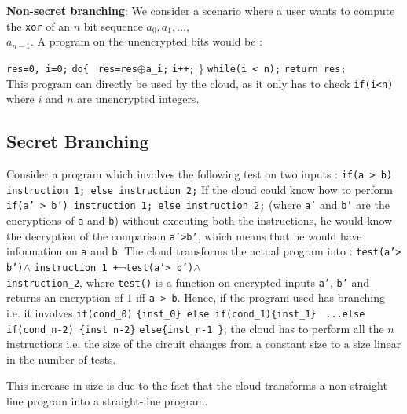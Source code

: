 \documentclass{acm_proc_article-sp}
\begin{document}
\textbf{Non-secret branching}: We consider a scenario where a user wants to compute the \texttt{xor} of an $n$ bit sequence $a_0,a_1,\ldots,$ \\ $a_{n-1}$. A program on the unencrypted bits would be :

 \phantom{x} \texttt{res=0, i=0;}
\newline \phantom{x} \texttt{do\{ }
\newline \phantom{x} \hspace{9ex} \texttt{res=res$\oplus$a\_i;}
\newline \phantom{x} \hspace{9ex} \texttt{i++;} 
\newline   \phantom{x} \} \texttt{while(i < n);} 
\newline  \phantom{x} \texttt{return res;}\\

This program can directly be used by the cloud, as it only has to check \texttt{if(i<n)} where $i$ and $n$ are unencrypted integers.

\subsection{Secret Branching}

Consider a program which involves the following test on two inputs : \texttt{if(a > b) instruction\_1; else instruction\_2;} If the cloud could know how to perform \texttt{if(a' > b') instruction\_1; else instruction\_2;} (where \texttt{a'} and \texttt{b'} are the encryptions of \texttt{a} and \texttt{b}) without executing both the instructions, he would know the decryption of the comparison \texttt{a'>b'}, which means that he would have information on \texttt{a} and \texttt{b}. The cloud transforms the actual program into : \texttt{test(a'> b')$\wedge$} \texttt{instruction\_1 +}$\neg$\texttt{test(a'> b')$\wedge$ } \\ \texttt{instruction\_2}, where \texttt{test()}  is a function on encrypted inputs \texttt{a'}, \texttt{b'} and returns an encryption of $1$ iff \texttt{a > b}. Hence, if the program used has branching i.e. it involves \texttt{if(cond\_0)} \texttt{\{inst\_0\} else if(cond\_1)\{inst\_1\}} \texttt{ ...else if(cond\_n-2) \{inst\_n-2\}} \texttt{else\{inst\_n-1 \}}; the cloud has to perform all the $n$ instructions i.e. the size of the circuit changes from a constant size to a size linear in the number of tests.

This increase in size is due to the fact that the cloud transforms a non-straight line program into a straight-line program.
\end{document}
